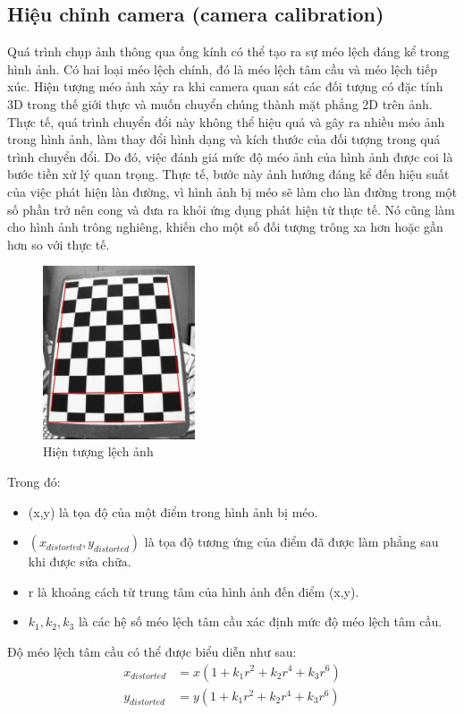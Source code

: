 \subsection{Hiệu chỉnh camera (camera calibration)}
Quá trình chụp ảnh thông qua ống kính có thể tạo ra sự méo lệch đáng kể trong hình ảnh. Có hai loại méo lệch chính, đó là méo lệch tâm cầu và méo lệch tiếp xúc. Hiện tượng méo ảnh xảy ra khi camera quan sát các đối tượng có đặc tính 3D trong thế giới thực và muốn chuyển chúng thành mặt phẳng 2D trên ảnh. Thực tế, quá trình chuyển đổi này không thể hiệu quả và gây ra nhiều méo ảnh trong hình ảnh, làm thay đổi hình dạng và kích thước của đối tượng trong quá trình chuyển đổi. Do đó, việc đánh giá mức độ méo ảnh của hình ảnh được coi là bước tiền xử lý quan trọng. Thực tế, bước này ảnh hưởng đáng kể đến hiệu suất của việc phát hiện làn đường, vì hình ảnh bị méo sẽ làm cho làn đường trong một số phần trở nên cong và đưa ra khỏi ứng dụng phát hiện từ thực tế. Nó cũng làm cho hình ảnh trông nghiêng, khiến cho một số đối tượng trông xa hơn hoặc gần hơn so với thực tế.
\newpage
\begin{figure}[htbp]
    \centering
    \includegraphics[width = 0.4\textwidth]{images/3-lane/calib_radial.jpg}
    \caption{Hiện tượng lệch ảnh}
\end{figure}
Trong đó:
\begin{itemize}
    \item (x,y) là tọa độ của một điểm trong hình ảnh bị méo.
    \item $(x_{distorted},y_{distorted})$ là tọa độ tương ứng của điểm đã được làm phẳng sau khi được sửa chữa.
    \item r là khoảng cách từ trung tâm của hình ảnh đến điểm (x,y).
    \item $k_1, k_2, k_3$ là các hệ số méo lệch tâm cầu xác định mức độ méo lệch tâm cầu.
\end{itemize}
\noindent Độ méo lệch tâm cầu có thể được biểu diễn như sau:
\begin{equation*}
    \begin{aligned}
        x_{distorted} &= x(1 + k_1 r^2 + k_2 r^4 + k_3 r^6)\\
        y_{distorted} &= y(1 + k_1 r^2 + k_2 r^4 + k_3 r^6)
    \end{aligned}
\end{equation*}

